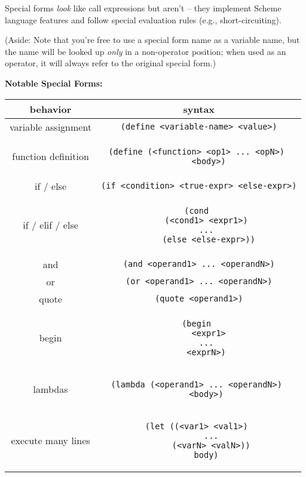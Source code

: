 Special forms \textit{look} like call expressions but aren't -- they implement Scheme language features and follow special evaluation rules (e.g., short-circuiting). 

(Aside: Note that you're free to use a special form name as a variable name, but the name will be looked up \textit{only} in a non-operator position; when used as an operator, it will always refer to the original special form.)

\textbf{Notable Special Forms:}
\begin{center}
\begin{tabular}{ |c|c| }
    \hline
    behavior & syntax \\
    \hline
    variable assignment   & \texttt{(define <variable-name> <value>)} \\
    \hline
    function definition & 
\begin{lstlisting}
(define (<function> <op1> ... <opN>) 
    <body>)
\end{lstlisting}  \\
    \hline
    if / else & \texttt{(if <condition> <true-expr> <else-expr>)} \\
    \hline
    if / elif / else  
& \begin{lstlisting}
(cond 
    (<cond1> <expr1>) 
    ... 
    (else <else-expr>))
\end{lstlisting} \\
    \hline
    and & \texttt{(and <operand1> ... <operandN>)} \\
    \hline
    or & \texttt{(or <operand1> ... <operandN>)} \\
    \hline
    quote & \texttt{(quote <operand1>)} \\
    \hline
    begin & 
\begin{lstlisting}
(begin 
    <expr1>
    ... 
    <exprN>) 
\end{lstlisting} \\
    \hline
    lambdas & 
\begin{lstlisting} 
(lambda (<operand1> ... <operandN>) 
    <body>) 
\end{lstlisting} \\
    \hline
    execute many lines & 
\begin{lstlisting} 
(let ((<var1> <val1>) 
      ... 
      (<varN> <valN>)) 
    body) 
\end{lstlisting}\\
    \hline
\end{tabular}
\end{center}